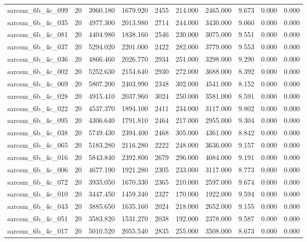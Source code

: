 \begin{tabular}{lrrrrrrrrr}
sarcsm\_6b\_4c\_099 & 20 & 3960.180 & 1679.920 & 2455 & 214.000 & 2465.000 & 9.673 & 0.000 & 0.000 \\
sarcsm\_6b\_4c\_035 & 20 & 4977.300 & 2013.980 & 2714 & 244.000 & 3430.000 & 9.060 & 0.000 & 0.000 \\
sarcsm\_6b\_4c\_081 & 20 & 4404.980 & 1838.160 & 2546 & 230.000 & 3075.000 & 9.551 & 0.000 & 0.000 \\
sarcsm\_6b\_4c\_037 & 20 & 5294.020 & 2201.000 & 2422 & 282.000 & 3779.000 & 9.553 & 0.000 & 0.000 \\
sarcsm\_6b\_4c\_036 & 20 & 4866.460 & 2026.770 & 2934 & 251.000 & 3298.000 & 9.290 & 0.000 & 0.000 \\
sarcsm\_6b\_4c\_002 & 20 & 5252.630 & 2154.640 & 2930 & 272.000 & 3688.000 & 8.392 & 0.000 & 0.000 \\
sarcsm\_6b\_4c\_069 & 20 & 5807.200 & 2403.990 & 2348 & 302.000 & 4541.000 & 8.152 & 0.000 & 0.000 \\
sarcsm\_6b\_4c\_028 & 20 & 4915.410 & 2037.960 & 3024 & 250.000 & 3581.000 & 8.591 & 0.000 & 0.000 \\
sarcsm\_6b\_4c\_022 & 20 & 4537.370 & 1894.100 & 2411 & 234.000 & 3117.000 & 9.802 & 0.000 & 0.000 \\
sarcsm\_6b\_4c\_095 & 20 & 4306.640 & 1791.810 & 2464 & 217.000 & 2955.000 & 9.304 & 0.000 & 0.000 \\
sarcsm\_6b\_4c\_038 & 20 & 5749.430 & 2394.400 & 2468 & 305.000 & 4361.000 & 8.842 & 0.000 & 0.000 \\
sarcsm\_6b\_4c\_065 & 20 & 5183.280 & 2116.280 & 2222 & 248.000 & 3636.000 & 9.157 & 0.000 & 0.000 \\
sarcsm\_6b\_4c\_016 & 20 & 5843.840 & 2392.800 & 2679 & 296.000 & 4084.000 & 9.191 & 0.000 & 0.000 \\
sarcsm\_6b\_4c\_006 & 20 & 4677.190 & 1921.280 & 2305 & 233.000 & 3117.000 & 8.773 & 0.000 & 0.000 \\
sarcsm\_6b\_4c\_072 & 20 & 3935.050 & 1670.330 & 2365 & 210.000 & 2597.000 & 9.674 & 0.000 & 0.000 \\
sarcsm\_6b\_4c\_010 & 20 & 3447.450 & 1459.340 & 2327 & 170.000 & 1922.000 & 9.594 & 0.000 & 0.000 \\
sarcsm\_6b\_4c\_043 & 20 & 3885.650 & 1635.160 & 2024 & 218.000 & 2652.000 & 9.155 & 0.000 & 0.000 \\
sarcsm\_6b\_4c\_051 & 20 & 3583.820 & 1531.270 & 2038 & 192.000 & 2378.000 & 9.587 & 0.000 & 0.000 \\
sarcsm\_6b\_4c\_017 & 20 & 5010.520 & 2055.540 & 2835 & 255.000 & 3508.000 & 8.673 & 0.000 & 0.000 \\

\end{tabular}

